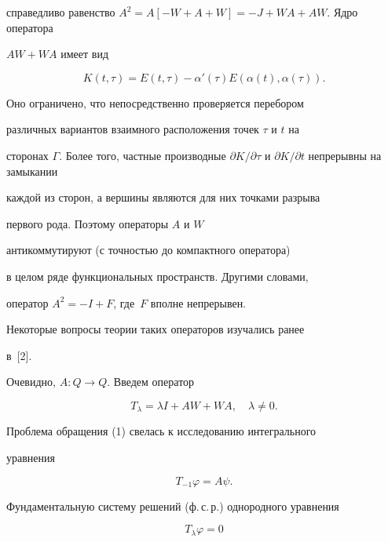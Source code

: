 справедливо равенство $A^{2}=A[-W+A+W]=-J+WA+AW$. Ядро оператора


$AW+WA$ имеет вид


\begin{equation}


K(t,\tau)=E(t,\tau)-\alpha'(\tau)E(\alpha(t),\alpha(\tau)).


\end{equation}


Оно ограничено, что непосредственно проверяется перебором


различных вариантов взаимного расположения точек $\tau$ и $t$ на


сторонах $\Gamma$. Более того, частные производные $\partial


K/\partial \tau$ и $\partial K/\partial t$ непрерывны на замыкании


каждой из сторон, а вершины являются для них точками разрыва


первого рода. Поэтому операторы $A$ и $W$


антикоммутируют (с точностью до компактного оператора)


в целом ряде функциональных пространств. Другими словами,


оператор $A^2=-I+F$, где~$F$ вполне непрерывен.


Некоторые вопросы теории таких операторов изучались ранее


в~[2].








Очевидно, $A: Q\longrightarrow Q$. Введем оператор


\begin{equation}


T_{\lambda}=\lambda I+AW+WA,\quad\lambda\ne 0.


\end{equation}


Проблема обращения (1) свелась к исследованию интегрального


уравнения


\begin{equation}


T_{-1} \varphi=A\psi.


\end{equation}


Фундаментальную систему решений (ф.\,с.\,р.) однородного уравнения


\begin{equation}


T_{\lambda} \varphi=0


\end{equation}


